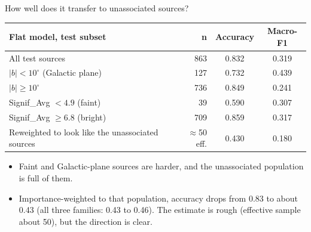 \documentclass[aspectratio=169, 10pt]{beamer}
\begin{document}
\begin{frame}{How well does it transfer to unassociated sources?}
  \centering\small
  \begin{tabular}{lrcc}
    \toprule
    Flat model, test subset & n & Accuracy & Macro-F1 \\
    \midrule
    All test sources & 863 & 0.832 & 0.319 \\
    \(|b| < 10^\circ\) (Galactic plane) & 127 & 0.732 & 0.439 \\
    \(|b| \ge 10^\circ\) & 736 & 0.849 & 0.241 \\
    Signif\_Avg \(< 4.9\) (faint) & 39 & 0.590 & 0.307 \\
    Signif\_Avg \(\ge 6.8\) (bright) & 709 & 0.859 & 0.317 \\
    Reweighted to look like the unassociated sources & \(\approx\)50 eff. & 0.430 & 0.180 \\
    \bottomrule
  \end{tabular}
  \vspace{0.3cm}
  \begin{itemize}\small
    \item Faint and Galactic-plane sources are harder, and the unassociated population is full of
          them.
    \item Importance-weighted to that population, accuracy drops from 0.83 to about 0.43 (all
          three families: 0.43 to 0.46). The estimate is rough (effective sample about 50), but the
          direction is clear.
  \end{itemize}
\end{frame}
\end{document}

